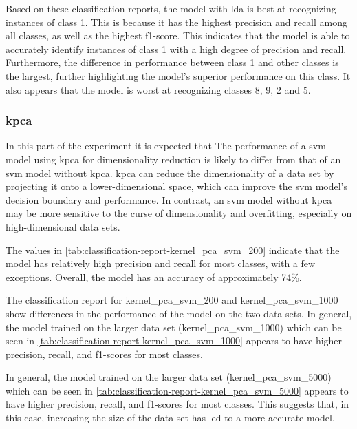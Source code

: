 Based on these classification reports, the model with \gls{lda} is best at recognizing instances of class 1. This is because it has the highest precision and recall among all classes, as well as the highest f1-score. This indicates that the model is able to accurately identify instances of class 1 with a high degree of precision and recall. Furthermore, the difference in performance between class 1 and other classes is the largest, further highlighting the model's superior performance on this class. It also appears that the model is worst at recognizing classes 8, 9, 2 and 5.

\subsubsection{\gls{kpca}}\label{subsubsec:experiment_4_kernel_pca}
In this part of the experiment it is expected that The performance of a \gls{svm} model using  \gls{kpca} for dimensionality reduction is likely to differ from that of an \gls{svm} model without \gls{kpca}. \gls{kpca} can reduce the dimensionality of a data set by projecting it onto a lower-dimensional space, which can improve the \gls{svm} model's decision boundary and performance. In contrast, an \gls{svm} model without \gls{kpca} may be more sensitive to the curse of dimensionality and overfitting, especially on high-dimensional data sets. 




The values in \ref{tab:classification-report-kernel_pca_svm_200} indicate that the model has relatively high precision and recall for most classes, with a few exceptions. Overall, the model has an accuracy of approximately 74\%.



The classification report for kernel\_pca\_svm\_200 and kernel\_pca\_svm\_1000 show differences in the performance of the model on the two data sets. In general, the model trained on the larger data set (kernel\_pca\_svm\_1000) which can be seen in \ref{tab:classification-report-kernel_pca_svm_1000} appears to have higher precision, recall, and f1-scores for most classes. 



In general, the model trained on the larger data set (kernel\_pca\_svm\_5000) which can be seen in \ref{tab:classification-report-kernel_pca_svm_5000} appears to have higher precision, recall, and f1-scores for most classes. This suggests that, in this case, increasing the size of the data set has led to a more accurate model.

